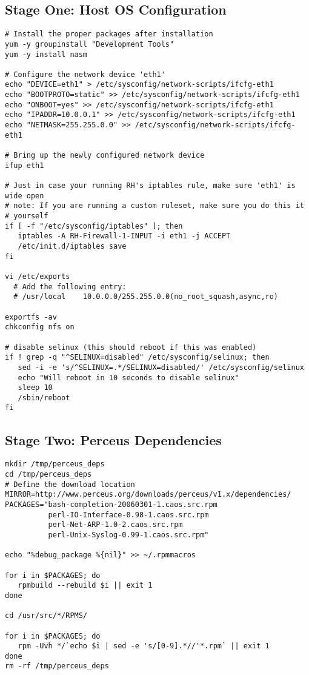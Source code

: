 \documentclass[10pt,letterpaper]{report}
\begin{document}
\subsection{Stage One:  Host OS Configuration}

\begin{verbatim}
# Install the proper packages after installation
yum -y groupinstall "Development Tools"
yum -y install nasm

# Configure the network device 'eth1'
echo "DEVICE=eth1" > /etc/sysconfig/network-scripts/ifcfg-eth1
echo "BOOTPROTO=static" >> /etc/sysconfig/network-scripts/ifcfg-eth1
echo "ONBOOT=yes" >> /etc/sysconfig/network-scripts/ifcfg-eth1
echo "IPADDR=10.0.0.1" >> /etc/sysconfig/network-scripts/ifcfg-eth1
echo "NETMASK=255.255.0.0" >> /etc/sysconfig/network-scripts/ifcfg-eth1

# Bring up the newly configured network device
ifup eth1

# Just in case your running RH's iptables rule, make sure 'eth1' is wide open
# note: If you are running a custom ruleset, make sure you do this it
# yourself
if [ -f "/etc/sysconfig/iptables" ]; then
   iptables -A RH-Firewall-1-INPUT -i eth1 -j ACCEPT
   /etc/init.d/iptables save
fi

vi /etc/exports
  # Add the following entry:
  # /usr/local    10.0.0.0/255.255.0.0(no_root_squash,async,ro)

exportfs -av
chkconfig nfs on

# disable selinux (this should reboot if this was enabled)
if ! grep -q "^SELINUX=disabled" /etc/sysconfig/selinux; then
   sed -i -e 's/^SELINUX=.*/SELINUX=disabled/' /etc/sysconfig/selinux
   echo "Will reboot in 10 seconds to disable selinux"
   sleep 10
   /sbin/reboot
fi
\end{verbatim}

\subsection{Stage Two: Perceus Dependencies}

\begin{verbatim}
mkdir /tmp/perceus_deps
cd /tmp/perceus_deps
# Define the download location
MIRROR=http://www.perceus.org/downloads/perceus/v1.x/dependencies/
PACKAGES="bash-completion-20060301-1.caos.src.rpm
          perl-IO-Interface-0.98-1.caos.src.rpm
          perl-Net-ARP-1.0-2.caos.src.rpm
          perl-Unix-Syslog-0.99-1.caos.src.rpm"

echo "%debug_package %{nil}" >> ~/.rpmmacros

for i in $PACKAGES; do
   rpmbuild --rebuild $i || exit 1
done

cd /usr/src/*/RPMS/

for i in $PACKAGES; do
   rpm -Uvh */`echo $i | sed -e 's/[0-9].*//'*.rpm` || exit 1
done
rm -rf /tmp/perceus_deps
\end{verbatim}
\end{document}
